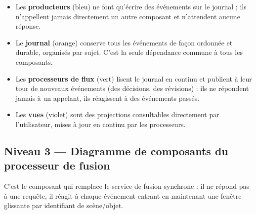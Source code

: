 \documentclass[11pt,a4paper]{article}
\begin{document}
\begin{center}
\end{center}

\begin{itemize}[leftmargin=1.2cm]
  \item Les \textbf{producteurs} (bleu) ne font qu'écrire des événements sur le journal ; ils
  n'appellent jamais directement un autre composant et n'attendent aucune réponse.
  \item Le \textbf{journal} (orange) conserve tous les événements de façon ordonnée et
  durable, organisés par sujet. C'est la seule dépendance commune à tous les composants.
  \item Les \textbf{processeurs de flux} (vert) lisent le journal en continu et publient à
  leur tour de nouveaux événements (des décisions, des révisions) : ils ne répondent jamais à
  un appelant, ils réagissent à des événements passés.
  \item Les \textbf{vues} (violet) sont des projections consultables directement par
  l'utilisateur, mises à jour en continu par les processeurs.
\end{itemize}

\subsection{Niveau 3 --- Diagramme de composants du processeur de fusion}

C'est le composant qui remplace le service de fusion synchrone : il ne répond pas à une
requête, il réagit à chaque événement entrant en maintenant une fenêtre glissante par
identifiant de scène/objet.
\end{document}
